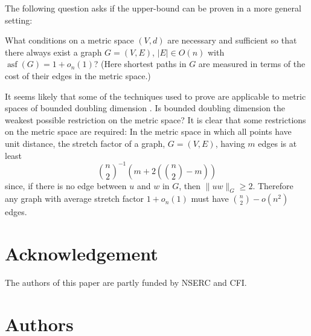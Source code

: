 \documentclass{patmorin}
\DeclareMathOperator{\asf}{asf}
\begin{document}
The following question asks if the upper-bound can be proven in a more
general setting:

\begin{op}
  What conditions on a metric space $(V,d)$ are necessary and sufficient
  so that there always exist a graph $G=(V,E)$, $|E|\in O(n)$ with
  $\asf(G)=1+o_n(1)$?  (Here shortest paths in $G$ are measured in terms
  of the cost of their edges in the metric space.)
\end{op}

It seems likely that some of the techniques used to prove
 are applicable to metric spaces of bounded doubling
dimension \cite[Section~10.13]{heinonen:lectures}.  Is bounded doubling
dimension the weakest possible restriction on the metric space?  It is
clear that some restrictions on the metric space are required: In the
metric space in which all points have unit distance, the stretch factor
of a graph, $G=(V,E)$, having $m$ edges is at least
\[
    \binom{n}{2}^{-1}\left(m + 2\left(\binom{n}{2}-m\right)\right) 
\]
since, if there is no edge between $u$ and $w$ in $G$, then $\|uw\|_G
\ge 2$.  Therefore any graph with average stretch factor $1+o_n(1)$
must have $\binom{n}{2}-o(n^2)$ edges.

\section*{Acknowledgement}

The authors of this paper are partly funded by NSERC and CFI.




\section*{Authors}
\end{document}
